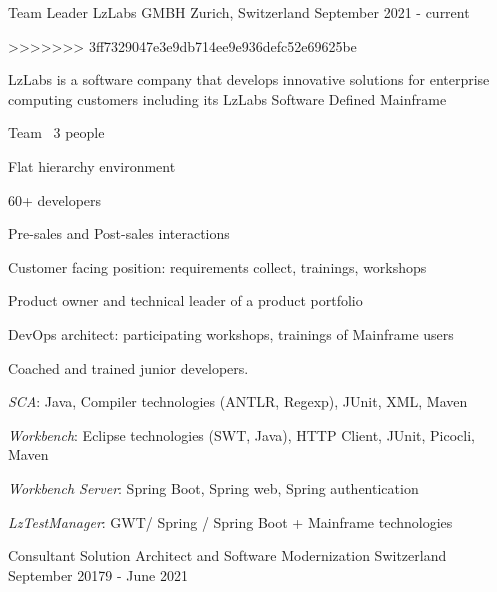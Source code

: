 \begin{cventries}
    \cventry
    {Team Leader} %
    {LzLabs GMBH} %
    {Zurich, Switzerland} %
    {September 2021 - current} %
    {
        \experience
>>>>>>> 3ff7329047e3e9db714ee9e936defc52e69625be
        {
        \begin{cvitems} %
            \item{LzLabs is a software company that develops innovative solutions for enterprise computing customers including its LzLabs Software Defined Mainframe}
            \item{Team ~3 people}
            \item{Flat hierarchy environment}
            \item{60+ developers}
            \item{Pre-sales and Post-sales interactions}
            \item{Customer facing position: requirements collect, trainings, workshops }
    \end{cvitems}
        }
        {
            \begin{cvitems}
                \item{Product owner and technical leader of a product portfolio}
                \item{DevOps architect: participating workshops, trainings of Mainframe users }
                \item{Coached and trained junior developers.}
            \end{cvitems}
        }
        {
            \begin{cvitems} %
                \item{\emph{SCA}: Java, Compiler technologies (ANTLR, Regexp), JUnit, XML, Maven}
                \item{\emph{Workbench}: Eclipse technologies (SWT, Java), HTTP Client, JUnit, Picocli, Maven}
                \item{\emph{Workbench Server}: Spring Boot, Spring web, Spring authentication}
                \item{\emph{LzTestManager}: GWT/ Spring / Spring Boot + Mainframe technologies}
            \end{cvitems}
        }     
    }
    \cventry
    {Consultant} %
    {Solution Architect and Software Modernization} %
    {Switzerland} %
    {September 20179 - June 2021} %
    {}%


\end{cventries}
